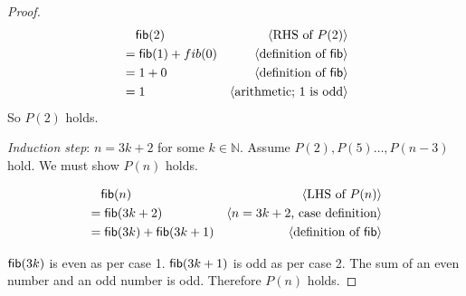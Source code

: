 \documentclass[11pt,fleqn]{article}
\newcommand{\mname}[1]{\mbox{\sf #1}}
\newcommand{\pnote}[1]{{\langle \text{#1} \rangle}}
\begin{document}
\begin{enumerate}
\begin{proof}
 \begin{align*}
 &\phantom{{}=} \mname{fib}(2) & \pnote{RHS of $P(2)$}\\
 &= \mname{fib}(1) + fib(0) & \pnote{definition of $\mname{fib}$}\\
 &= 1 + 0 & \pnote{definition of $\mname{fib}$}\\
 &= 1 & \pnote{arithmetic; 1 is odd}
 \end{align*}
 So $P(2)$ holds.

 \emph{Induction step}: $n = 3k + 2$ for some $k \in \mathbb{N}$. Assume
 $P(2),P(5)\dots,P(n-3)$ hold. We must show $P(n)$ holds.

 \begin{align*}
 &\phantom{{}=} \mname{fib}(n) & \pnote{LHS of $P(n)$}\\
 &= \mname{fib}(3k + 2) & \pnote{$n = 3k + 2$, case definition}\\
 &= \mname{fib}(3k) + \mname{fib}(3k + 1) & \pnote{definition of $\mname{fib}$}
 \end{align*}

 $\mname{fib}(3k)$ is even as per case 1. $\mname{fib}(3k+1)$ is odd 
 as per case 2. The sum of an even number and an odd number is odd.
 Therefore $P(n)$ holds.
 \end{proof}

\end{enumerate}
\end{document}
